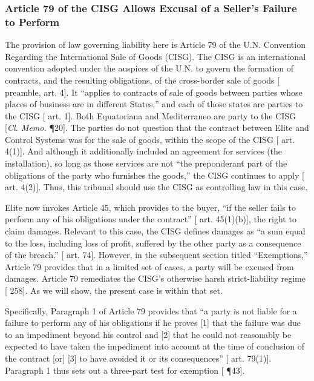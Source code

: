 \subsubsection{Article 79 of the CISG Allows Excusal of a Seller's Failure to Perform}

The provision of law governing liability here is Article 79 of the U.N. Convention Regarding the International Sale of Goods (CISG). The CISG is an international convention adopted under the auspices of the U.N. to govern the formation of contracts, and the resulting obligations, of the cross-border sale of goods [\cite{CISG} preamble, art. 4]. It ``applies to contracts of sale of goods between parties whose places of business are in different States,'' and each of those states are parties to the CISG [\cite{CISG} art. 1]. Both Equatoriana and Mediterraneo are party to the CISG [\textit{Cl. Memo.} \P20]. The parties do not question that the contract between Elite and Control Systems was for the sale of goods, within the scope of the CISG [\cite{CISG} art. 4(1)]. And although it additionally included an agreement for services (the installation), so long as those services are not ``the preponderant part of the obligations of the party who furnishes the goods,'' the CISG continues to apply [\cite{CISG} art. 4(2)]. Thus, this tribunal should use the CISG as controlling law in this case.

Elite now invokes Article 45, which provides to the buyer, ``if the seller fails to perform any of his obligations under the contract'' [\cite{CISG} art. 45(1)(b)], the right to claim damages. Relevant to this case, the CISG defines damages as ``a sum equal to the loss, including loss of profit, suffered by the other party as a consequence of the breach.'' [\cite{CISG} art. 74]. However, in the subsequent section titled ``Exemptions,'' Article 79 provides that in a limited set of cases, a party will be excused from damages. Article 79 remediates the CISG's otherwise harsh strict-liability regime [\cite{Huber Mullis} 258].  As we will show, the present case is within that set.

Specifically, Paragraph 1 of Article 79 provides that ``a party is not liable for a failure to perform any of his obligations if he proves [1] that the failure was due to an impediment beyond his control and [2] that he could not reasonably be expected to have taken the impediment into account at the time of conclusion of the contract [or] [3] to have avoided it or its consequences'' [\cite{CISG} art. 79(1)]. Paragraph 1 thus sets out a three-part test for exemption [\cite{Atamer} \P43]. 

